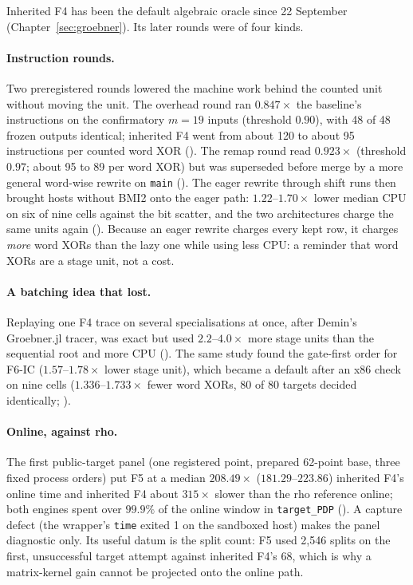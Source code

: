 Inherited F4 has been the default algebraic oracle since 22 September
(Chapter~\ref{sec:groebner}). Its later rounds were of four kinds.

\paragraph{Instruction rounds.} Two preregistered rounds lowered the machine
work behind the counted unit without moving the unit. The overhead round
ran $0.847\times$ the baseline's instructions on the confirmatory $m=19$
inputs (threshold $0.90$), with 48 of 48 frozen outputs identical; inherited
F4 went from about 120 to about 95 instructions per counted word XOR
(). The remap round
read $0.923\times$ (threshold $0.97$; about 95 to 89 per word XOR) but was
superseded before merge by a more general word-wise rewrite on
\texttt{main} (). The
eager rewrite through shift runs then brought hosts without BMI2 onto the
eager path: $1.22$--$1.70\times$ lower median CPU on six of nine cells
against the bit scatter, and the two architectures charge the same units
again (). Because
an eager rewrite charges every kept row, it charges \emph{more} word XORs
than the lazy one while using less CPU: a reminder that word XORs are a
stage unit, not a cost.

\paragraph{A batching idea that lost.} Replaying one F4 trace on several
specialisations at once, after Demin's Groebner.jl tracer, was exact but
used $2.2$--$4.0\times$ more stage units than the sequential root and more
CPU (). The same
study found the gate-first order for F6-IC ($1.57$--$1.78\times$ lower stage
unit), which became a default after an x86 check on nine cells ($1.336$--$1.733\times$
fewer word XORs, 80 of 80 targets decided identically;
).

\paragraph{Online, against rho.} The first public-target panel (one
registered point, prepared 62-point base, three fixed process orders) put
F5 at a median $208.49\times$ ($181.29$--$223.86$) inherited F4's online time
and inherited F4 about $315\times$ slower than the rho reference online; both
engines spent over $99.9\%$ of the online window in \texttt{target\_PDP}
(). A capture defect (the
wrapper's \texttt{time} exited 1 on the sandboxed host) makes the panel
diagnostic only. Its useful datum is the split count: F5 used 2{,}546 splits
on the first, unsuccessful target attempt against inherited F4's 68, which
is why a matrix-kernel gain cannot be projected onto the online path.


